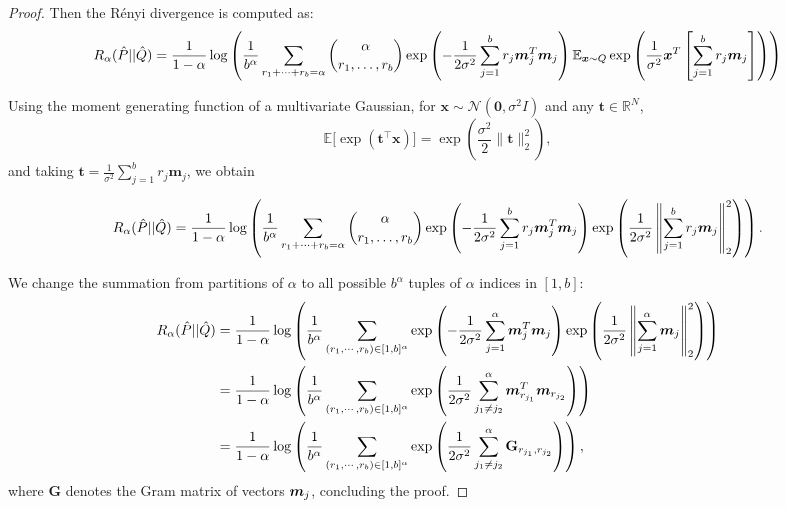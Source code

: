 \documentclass{article}
\theoremstyle{plain}
\theoremstyle{definition}
\theoremstyle{remark}
\begin{document}
\begin{proof}
Then the R\'enyi divergence is computed as:
%
\begin{equation*}
     R_\alpha(\hat{P} || \hat{Q}) = \frac{1}{1 - \alpha} \log \left(\frac{1}{b^\alpha} \sum_{r_1 + \cdots + r_b = \alpha}
    \binom{\alpha}{r_1,\dots,r_b}\exp \left(-\frac{1}{2\sigma^2}\sum\limits_{j = 1}^{b}r_j{\bm{m}}_j^T{\bm{m}}_j\right)
    \mathbb{E}_{{\bm{x}} \sim Q}\exp\left(
         \frac{1}{\sigma^2} {\bm{x}}^T \left[\sum\limits_{j = 1}^{b} r_j {\bm{m}}_j\right]
    \right)\right)
\end{equation*}

Using the moment generating function of a multivariate Gaussian, for $\mathbf{x}\sim \mathcal{N}(\mathbf{0}, \sigma^2 I)$ and any $\mathbf{t}\in\mathbb{R}^N$,
\[
\mathbb{E}\big[\exp(\mathbf{t}^\top \mathbf{x})\big]
=
\exp\!\left(\frac{\sigma^2}{2}\|\mathbf{t}\|_2^2\right),
\]
and taking $\mathbf{t} = \frac{1}{\sigma^2}\sum_{j=1}^{b}r_j\mathbf{m}_j$, we obtain

\begin{equation}
\label{eq:R_alpha_P_Q}
    R_\alpha(\hat{P} || \hat{Q})
    = \frac{1}{1 - \alpha} \log \left(\frac{1}{b^\alpha} \sum_{r_1 + \cdots + r_b = \alpha}
    \binom{\alpha}{r_1,\dots,r_b}\exp \left(-\frac{1}{2\sigma^2}\sum\limits_{j = 1}^{b}r_j{\bm{m}}_j^T{\bm{m}}_j \right)
    \exp\left(
         \frac{1}{2\sigma^2} \left\|\sum\limits_{j = 1}^{b} r_j {\bm{m}}_j\right\|^2_2
    \right)\right).
\end{equation}

We change the summation from partitions of $\alpha$ to all possible $b^{\alpha}$ tuples of $\alpha$ indices in $[1, b]$:
%
\begin{align*}
    R_\alpha(\hat{P} || \hat{Q})
    &= \frac{1}{1 - \alpha} \log \left(\frac{1}{b^\alpha} \sum_{(r_1, \cdots, r_b) \in [1, b]^\alpha}
    \exp \left(-\frac{1}{2\sigma^2}\sum\limits_{j = 1}^{\alpha}{\bm{m}}_j^T{\bm{m}}_j \right)
    \exp\left(
         \frac{1}{2\sigma^2} \left\|\sum\limits_{j = 1}^{\alpha} {\bm{m}}_j\right\|^2_2
    \right)\right)\\
    &= \frac{1}{1 - \alpha} \log \left(\frac{1}{b^\alpha} \sum_{(r_1, \cdots, r_b) \in [1, b]^\alpha}
    \exp \left(\frac{1}{2\sigma^2}\sum\limits_{j_1 \ne j_2}^{\alpha}{\bm{m}}_{r_{j_1}}^T{\bm{m}}_{r_{j_2}} \right)\right)\\
    &=\frac{1}{1 - \alpha} \log \left(\frac{1}{b^\alpha} \sum_{(r_1, \cdots, r_b) \in [1, b]^\alpha}
    \exp \left(\frac{1}{2\sigma^2}\sum\limits_{j_1 \ne j_2}^{\alpha}\mathbf{G}_{r_{j_1}, r_{j_2}} \right)\right),
\end{align*}
where $\mathbf{G}$ denotes the Gram matrix of vectors ${\bm{m}}_j$, concluding the proof.
\end{proof}
\end{document}
